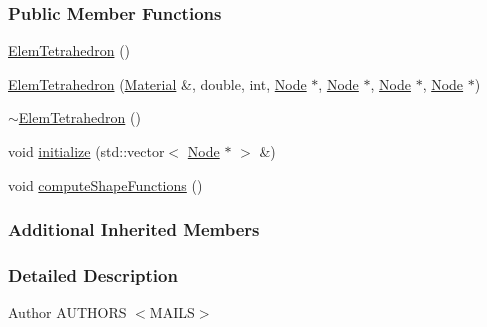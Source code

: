 \subsubsection*{Public Member Functions}
\begin{DoxyCompactItemize}
\item 
\hyperlink{classmknix_1_1_elem_tetrahedron_aa3141ce1b742562eb40bfe0c7e376956}{Elem\-Tetrahedron} ()
\item 
\hyperlink{classmknix_1_1_elem_tetrahedron_acc770204f5dd41e0cf453c6235535115}{Elem\-Tetrahedron} (\hyperlink{classmknix_1_1_material}{Material} \&, double, int, \hyperlink{classmknix_1_1_node}{Node} $\ast$, \hyperlink{classmknix_1_1_node}{Node} $\ast$, \hyperlink{classmknix_1_1_node}{Node} $\ast$, \hyperlink{classmknix_1_1_node}{Node} $\ast$)
\item 
\hyperlink{classmknix_1_1_elem_tetrahedron_a2f836d024ff3adf00b94a3371505cff4}{$\sim$\-Elem\-Tetrahedron} ()
\item 
void \hyperlink{classmknix_1_1_elem_tetrahedron_a1f42683d35b87bfd4ddd4e83824d040d}{initialize} (std\-::vector$<$ \hyperlink{classmknix_1_1_node}{Node} $\ast$ $>$ \&)
\item 
void \hyperlink{classmknix_1_1_elem_tetrahedron_a09d199d493dd9642da2ccb7190306b18}{compute\-Shape\-Functions} ()
\end{DoxyCompactItemize}
\subsubsection*{Additional Inherited Members}


\subsubsection{Detailed Description}
\begin{DoxyAuthor}{Author}
A\-U\-T\-H\-O\-R\-S $<$\-M\-A\-I\-L\-S$>$ 
\end{DoxyAuthor}


